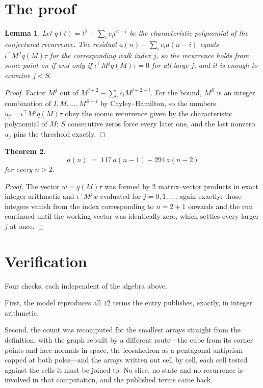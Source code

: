 \documentclass[11pt,a4paper]{article}
\theoremstyle{plain}
\newtheorem{theorem}{Theorem}
\newtheorem{lemma}[theorem]{Lemma}
\theoremstyle{definition}
\begin{document}
\section{The proof}

\begin{lemma}\label{lem:crit}
Let $q(t)=t^{2}-\sum_i c_it^{2-i}$ be the characteristic polynomial of the
conjectured recurrence. The residual $a(n)-\sum_ic_ia(n-i)$ equals
$\iota^{\!\top}M^{\,j}q(M)\tau$ for the corresponding walk index $j$, so the recurrence
holds from some point on if and only if $\iota^{\!\top}M^{j}q(M)\tau=0$ for all large $j$,
and it is enough to examine $j<S$.
\end{lemma}

\begin{proof}
Factor $M^{j}$ out of $M^{j+2}-\sum_ic_iM^{j+2-i}$. For the bound, $M^{S}$
is an integer combination of $I,M,\dots,M^{S-1}$ by Cayley--Hamilton, so the numbers
$u_j=\iota^{\!\top}M^{j}q(M)\tau$ obey the monic recurrence given by the characteristic
polynomial of $M$; $S$ consecutive zeros force every later one, and the last nonzero $u_j$
pins the threshold exactly.
\end{proof}

\begin{theorem}
\[
a(n)\;=\;117\,a(n-1) - 294\,a(n-2)
\]
for every $n>2$.
\end{theorem}

\begin{proof}
The vector $w=q(M)\tau$ was formed by $2$ matrix--vector products in exact integer
arithmetic and $\iota^{\!\top}M^{j}w$ evaluated for $j=0,1,\dots$, again exactly; those
integers vanish from the index corresponding to $n=2+1$ onwards and the run continued
until the working vector was identically zero, which settles every larger $j$ at once.
\end{proof}

\section{Verification}

Four checks, each independent of the algebra above.

First, the model reproduces all $12$ terms the entry publishes, exactly, in integer
arithmetic.

Second, the count was recomputed for the smallest arrays straight from the definition, with the
graph rebuilt by a different route---the cube from its corner points and face normals in space,
the icosahedron as a pentagonal antiprism capped at both poles---and the arrays written out cell
by cell, each cell tested against the cells it must be joined to. No slice, no state and no
recurrence is involved in that computation, and the published terms came back.
\end{document}
